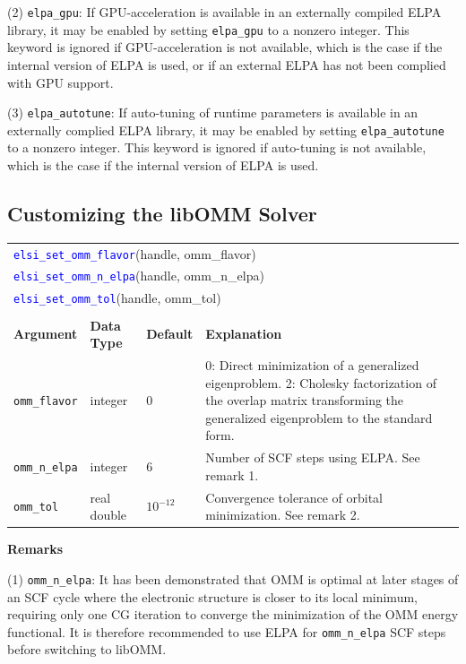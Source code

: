 \documentclass{report}
\newcommand{\api}[1]{\textcolor{blue}{\texttt{#1}}}
\begin{document}
(2) \texttt{elpa\_gpu}: If GPU-acceleration is available in an externally compiled ELPA library, it may be enabled by setting \texttt{elpa\_gpu} to a nonzero integer. This keyword is ignored if GPU-acceleration is not available, which is the case if the internal version of ELPA is used, or if an external ELPA has not been complied with GPU support.

(3) \texttt{elpa\_autotune}: If auto-tuning of runtime parameters is available in an externally complied ELPA library, it may be enabled by setting \texttt{elpa\_autotune} to a nonzero integer. This keyword is ignored if auto-tuning is not available, which is the case if the internal version of ELPA is used.

\subsection{Customizing the libOMM Solver}
\label{subsec:setter_omm}
\begin{tabular}[]{|p{30mm}|p{20mm}|p{15mm}|p{97mm}|}
\multicolumn{4}{l}{\api{elsi\_set\_omm\_flavor}(handle, omm\_flavor)}\\
\multicolumn{4}{l}{\api{elsi\_set\_omm\_n\_elpa}(handle, omm\_n\_elpa)}\\
\multicolumn{4}{l}{\api{elsi\_set\_omm\_tol}(handle, omm\_tol)}\\
\multicolumn{4}{l}{}\\
\hline
\multicolumn{1}{|l|}{\textbf{Argument}} & \multicolumn{1}{l|}{\textbf{Data Type}} & \multicolumn{1}{l|}{\textbf{Default}} & \multicolumn{1}{l|}{\textbf{Explanation}}\\
\hline
\texttt{omm\_flavor}  & integer     & 0          & 0: Direct minimization of a generalized eigenproblem. 2: Cholesky factorization of the overlap matrix transforming the generalized eigenproblem to the standard form.\\
\hline
\texttt{omm\_n\_elpa} & integer     & 6          & Number of SCF steps using ELPA. See remark 1.\\
\hline
\texttt{omm\_tol}     & real double & $10^{-12}$ & Convergence tolerance of orbital minimization. See remark 2.\\
\hline
\end{tabular}

\textbf{Remarks}

(1) \texttt{omm\_n\_elpa}: It has been demonstrated that OMM is optimal at later stages of an SCF cycle where the electronic structure is closer to its local minimum, requiring only one CG iteration to converge the minimization of the OMM energy functional. It is therefore recommended to use ELPA for \texttt{omm\_n\_elpa} SCF steps before switching to libOMM.
\end{document}
